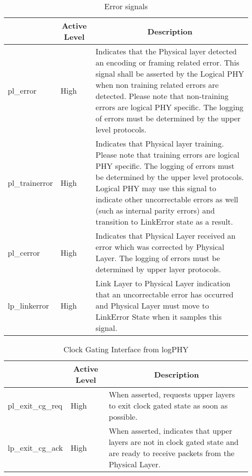 \begin{table}[H]
    
    \caption{Error signals}
    \centering
  \label{tab:l2}
  \begin{tabular}{ |m{26mm}|m{10mm}|m{60mm}|  }
\hline
\rowcolor{Gray}
\multicolumn{1}{|c|}{\textbf{Name} } 
& \multicolumn{1}{|c|}{\textbf{Active Level}} 
& \multicolumn{1}{|c|}{\textbf{Description}}\\
\hline
pl\_error & High &  
Indicates that the Physical layer detected an encoding or framing related error. This
signal shall be asserted by the Logical PHY when non training related errors are
detected.
Please note that non-training errors are logical PHY specific.
The logging of errors must be determined by the upper level protocols. \\ \hline
pl\_trainerror & High &
Indicates that Physical layer training. Please note that training errors are logical PHY
specific.
The logging of errors must be determined by the upper level protocols. Logical PHY
may use this signal to indicate other uncorrectable errors as well (such as internal parity
errors) and transition to LinkError state as a result.
\\ \hline
pl\_cerror & High  & Indicates that Physical Layer received an error which was corrected by Physical Layer.
The logging of errors must be determined by upper layer protocols. \\ \hline 
lp\_linkerror & High &  
Link Layer to Physical Layer indication that an uncorrectable error has occurred and
Physical Layer must move to LinkError State when it samples this signal. \\ \hline 

\end{tabular}
\end{table}

\begin{table}[H]
    \caption{Clock Gating Interface from logPHY}
    \label{tab:l3}

    \centering
  \begin{tabular}{ |m{26mm}|m{10mm}|m{60mm}|  }
\hline
\rowcolor{Gray}
\multicolumn{1}{|c|}{\textbf{Name} } 
& \multicolumn{1}{|c|}{\textbf{Active Level}} 
& \multicolumn{1}{|c|}{\textbf{Description}}\\
\hline
pl\_exit\_cg\_req & High & When asserted, requests upper layers to exit clock gated state as soon as possible. \\ \hline
lp\_exit\_cg\_ack & High & When asserted, indicates that upper layers are not in clock gated state and are ready to
receive packets from the Physical Layer. \\ \hline
\end{tabular}
\end{table}

